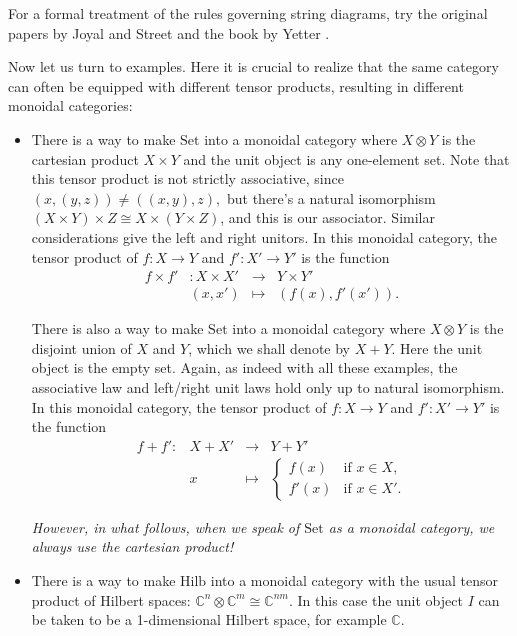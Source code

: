 \documentclass[12pt,twoside,openright]{report}
\newcommand{\CC}{\mathbb{C}}
\newcommand{\Hilb}{\mathrm{Hilb}}
\newcommand{\Set}{\mathrm{Set}}
\newcommand{\maps}{\colon}
\newcommand{\iso}{\cong}
\newcommand{\tensor}{\otimes}
\renewcommand{\text}{\mbox}
\begin{document}
For a formal treatment of the rules governing string diagrams, try the original papers by Joyal and Street \cite{JS0}
and the book by Yetter \cite{Yetter}.

Now let us turn to examples.  Here it is crucial to realize that the same category can often be equipped with different tensor products, resulting in different monoidal categories:

\begin{itemize}

\item There is a way to make $\Set$ into a monoidal category where
$X \tensor Y$ is the cartesian product $X \times Y$ and the unit object is any one-element set.  Note that this tensor product is not strictly associative, since $(x, (y, z)) \ne ((x, y), z),$ but there's a natural isomorphism $(X \times Y) \times Z \iso X \times (Y \times Z)$, and this is our associator.  Similar considerations give the left and right unitors.  In this monoidal category, the tensor product of $f \maps X \to Y$ and $f' \maps X' \to Y'$ is the function
\[
\begin{array}{rccl}
        f \times f' & \maps X\times X'& \to& Y\times Y' \\
                    & (x,x') &\mapsto & (f(x),f'(x')) .
\end{array}
\]

There is also a way to make $\Set$ into a monoidal category where
$X \tensor Y$ is the disjoint union of $X$ and $Y$, which we shall denote by $X + Y$.  Here the unit object is the empty set. Again, as indeed with all these examples, the associative law and left/right unit laws hold only up to natural isomorphism.  In this monoidal category, the tensor product of $f \maps X \to Y$ and 
$f' \maps X' \to Y'$ is the function
\[
\begin{array}{rccl}
 f+f' \maps & X+X'  &\to&  Y+Y'  \\
           &      x &\mapsto& 
\left\{
\begin{array}{cl} 
f(x) & \text{if $x \in X$,} \\ 
f'(x) & \text{if $x \in X'$.}
\end{array} \right.
\end{array}
\]

{\em However, in what follows, when we speak of $\Set$ as a monoidal category, we always use the cartesian product!}

\item There is a way to make $\Hilb$ into a monoidal category with the usual tensor product of Hilbert spaces: $\CC^n \tensor \CC^m \cong 
\CC^{nm}.$  In this case the unit object $I$ can be taken to be a
1-dimensional Hilbert space, for example $\CC$.  


\end{itemize}
\end{document}
